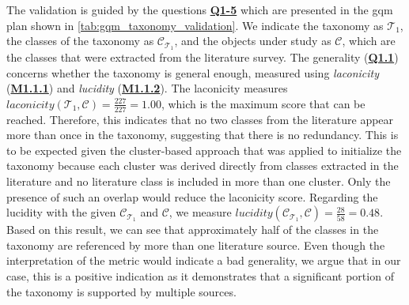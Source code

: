\begin{sloppypar}
The validation is guided by the questions \hyperref[tab:gqm_taxonomy_validation]{\textbf{Q1-5}} which are presented in the \gls{gqm} plan shown in \autoref{tab:gqm_taxonomy_validation}. We indicate the taxonomy as $\mathcal{T}_1$, the classes of the taxonomy as $\mathcal{C}_{\mathcal{T}_1}$, and the objects under study as $\mathcal{C}$, which are the classes that were extracted from the literature survey. The generality (\hyperref[tab:gqm_taxonomy_validation]{\textbf{Q1.1}}) concerns whether the taxonomy is general enough, measured using \emph{laconicity} (\hyperref[tab:gqm_taxonomy_validation]{\textbf{M1.1.1}}) and \emph{lucidity} (\hyperref[tab:gqm_taxonomy_validation]{\textbf{M1.1.2}}). The laconicity measures $laconicity(\mathcal{T}_1, \mathcal{C}) = \frac{227}{227} = 1.00$, which is the maximum score that can be reached. Therefore, this indicates that no two classes from the literature appear more than once in the taxonomy, suggesting that there is no redundancy. This is to be expected given the cluster-based approach that was applied to initialize the taxonomy because each cluster was derived directly from classes extracted in the literature and no literature class is included in more than one cluster. Only the presence of such an overlap would reduce the laconicity score. Regarding the lucidity with the given $\mathcal{C}_{\mathcal{T}_1}$ and $\mathcal{C}$, we measure $lucidity(\mathcal{C}_{\mathcal{T}_1}, \mathcal{C}) = \frac{28}{58} = 0.48$. Based on this result, we can see that approximately half of the classes in the taxonomy are referenced by more than one literature source. Even though the interpretation of the metric would indicate a bad generality, we argue that in our case, this is a positive indication as it demonstrates that a significant portion of the taxonomy is supported by multiple sources. 
\end{sloppypar}

